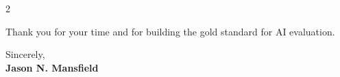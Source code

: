 \documentclass[10pt, a4paper]{article}
\begin{document}
\begin{paracol}{2}
\begin{rightcolumn}
\begin{minipage}{0.85\linewidth}
        \medskip

        \noindent Thank you for your time and for building the gold standard for AI evaluation.

        \vspace{4em}

        \noindent Sincerely,\\
        \textbf{Jason N. Mansfield}
    \end{minipage}
\end{rightcolumn}

\end{paracol}
\end{document}
